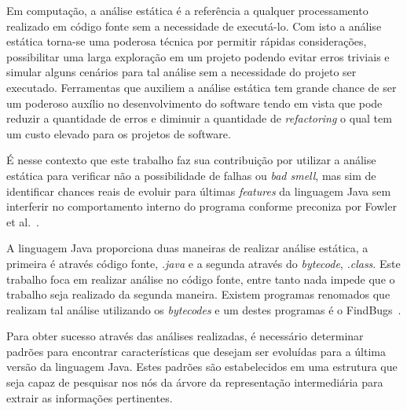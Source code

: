 Em computação, a análise estática é a referência a qualquer processamento realizado em código fonte sem a necessidade de executá-lo. Com isto a análise estática torna-se uma poderosa técnica por permitir rápidas considerações, possibilitar uma larga exploração em um projeto podendo evitar erros triviais e simular alguns cenários para tal análise sem a necessidade do projeto ser executado. Ferramentas que auxiliem a análise estática tem grande chance de ser um poderoso auxílio no desenvolvimento do software tendo em vista que pode reduzir a quantidade de erros e diminuir a quantidade de \textit{refactoring} o qual tem um custo elevado para os projetos de software.

É nesse contexto que este trabalho faz sua contribuição por utilizar a análise estática para verificar não a possibilidade de falhas ou \textit{bad smell}, mas sim de identificar chances reais de evoluir para últimas \textit{features} da linguagem Java sem interferir no comportamento interno do programa conforme preconiza por Fowler et al.~\cite{martinFowlerRafactoring}.

A linguagem Java proporciona duas maneiras de realizar análise estática, a primeira é através código fonte, \textit{.java} e a segunda através do \textit{bytecode}, \textit{.class}. Este trabalho foca em realizar análise no código fonte, entre tanto nada impede que o trabalho seja realizado da segunda maneira. Existem programas renomados que realizam tal análise utilizando os \textit{bytecodes} e um destes programas é o FindBugs~\cite{FindBugs}.


Para obter sucesso através das análises realizadas, é necessário determinar padrões para encontrar características que desejam ser evoluídas para a última versão da linguagem Java. Estes padrões são estabelecidos em uma estrutura que seja capaz de pesquisar nos nós da árvore da representação intermediária para extrair as informações pertinentes.


